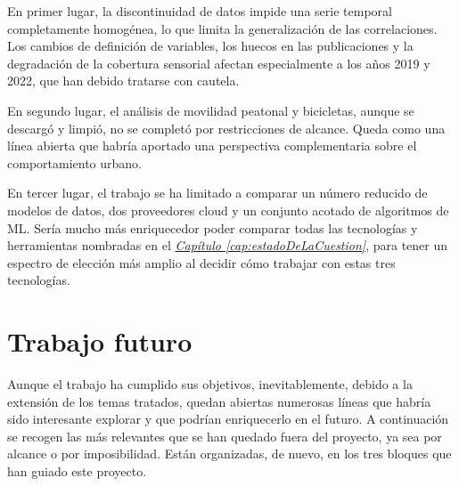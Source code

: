 En primer lugar, la discontinuidad de datos impide una serie temporal completamente homogénea, lo que limita la generalización de las correlaciones. Los cambios de definición de variables, los huecos en las publicaciones y la degradación de la cobertura sensorial afectan especialmente a los años 2019 y 2022, que han debido tratarse con cautela.

En segundo lugar, el análisis de movilidad peatonal y bicicletas, aunque se descargó y limpió, no se completó por restricciones de alcance. Queda como una línea abierta que habría aportado una perspectiva complementaria sobre el comportamiento urbano.

En tercer lugar, el trabajo se ha limitado a comparar un número reducido de modelos de datos, dos proveedores cloud y un conjunto acotado de algoritmos de ML. Sería mucho más enriquecedor poder comparar todas las tecnologías y herramientas nombradas en el \hyperref[cap:estadoDeLaCuestion]{\textit{Capítulo \ref*{cap:estadoDeLaCuestion}}}, para tener un espectro de elección más amplio al decidir cómo trabajar con estas tres tecnologías.

\section{Trabajo futuro}

Aunque el trabajo ha cumplido sus objetivos, inevitablemente, debido a la extensión de los temas tratados, quedan abiertas numerosas líneas que habría sido interesante explorar y que podrían enriquecerlo en el futuro. A continuación se recogen las más relevantes que se han quedado fuera del proyecto, ya sea por alcance o por imposibilidad. Están organizadas, de nuevo, en los tres bloques que han guiado este proyecto.

